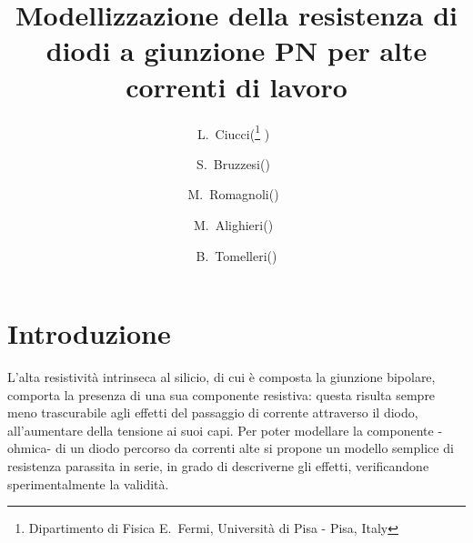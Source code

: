 \documentclass{article}[a4paper, oneside, 11pt]
\title{Modellizzazione della resistenza di diodi a giunzione PN per alte 
correnti di lavoro}
\author{L.~Ciucci(\thanks{Dipartimento di Fisica E.~Fermi, Universit\`a di Pisa 
- Pisa, Italy} )~\and S.~Bruzzesi(\protect\footnotemark[1] )~\and 
M.~Romagnoli(\protect\footnotemark[1] )~\and 
M.~Alighieri(\protect\footnotemark[1] )~\and 
B.~Tomelleri(\protect\footnotemark[1] )}
\begin{document}
\maketitle



\section{Introduzione}
L'alta resistività intrinseca al silicio, di cui è composta la giunzione
bipolare, comporta la presenza di una sua componente resistiva: questa 
risulta sempre meno trascurabile agli effetti del passaggio di corrente
attraverso il diodo, all'aumentare della tensione ai suoi capi.
Per poter modellare la componente -ohmica- di un diodo
percorso da correnti alte si propone un modello semplice di resistenza
parassita in serie, in grado di descriverne gli effetti, verificandone 
sperimentalmente la validità.


\end{document}
